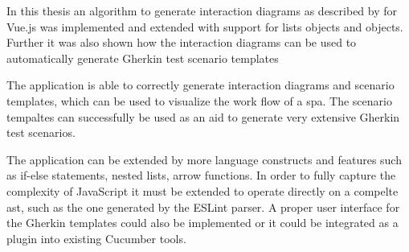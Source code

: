 In this thesis an algorithm to generate interaction diagrams as described by \textcite{zhang2019scenario} for Vue.js was implemented and extended with support for lists objects and objects. Further it was also shown how the interaction diagrams can be used to automatically generate Gherkin test scenario templates

The application is able to correctly generate interaction diagrams and scenario templates, which can be used to visualize the work flow of a \gls{spa}. The scenario tempaltes can successfully be used as an aid to generate very extensive Gherkin test scenarios. 

The application can be extended by more language constructs and features such as if-else statements, nested lists, arrow functions. In order to fully capture the complexity of JavaScript it must be extended to operate directly on a compelte \gls{ast}, such as the one generated by the ESLint parser.
A proper user interface for the Gherkin templates could also be implemented or it could be integrated as a plugin into existing Cucumber tools.